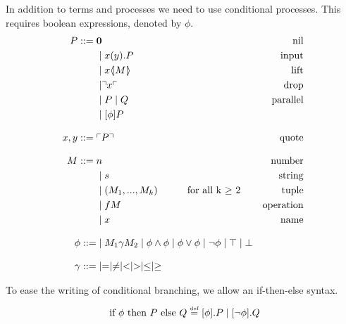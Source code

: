 In addition to terms and processes we need to use conditional processes. This requires boolean expressions, denoted by \ensuremath{\phi}.
\begin{align*}
P  ::= \; &  \mathbf{0} & \text{nil} \\
      & \mid x(y).P & \text{input} \\
	  & \mid x \langle \! | M | \! \rangle&\text{lift}\\
      & \mid \urcorner x \ulcorner & \text{drop} \\
      & \mid P \mid Q & \text{parallel} \\
      & \mid [\phi] P\\[3mm]
    x,y ::= \; & \ulcorner P \urcorner & \text{quote}\\[3mm]
M::=\; & n &\text{number}\\
 	  &\mid s &\text{string}\\
 	  &\mid (M_1,...,M_k)\quad\quad\quad \text{for all k $\geq$ 2} &\text{tuple}\\
 	  &\mid fM &\text{operation}\\
 	  &\mid x &\text{name}\\[3mm]
\phi ::=& \mid M_1\gamma M_2 \mid \phi\land\phi \mid \phi\lor\phi \mid \neg\phi \mid \top \mid \bot\\[3mm]
\gamma ::=& \mid = \mid \neq \mid < \mid > \mid \leq \mid \geq
\end{align*}

To ease the writing of conditional branching, we allow an if-then-else syntax.
\begin{align*}
	\text{ if }\phi\text{ then }P\text{ else }Q \overset{\underset{\mathrm{def}}{}}{=} [\phi].P \mid [\neg \phi].Q
\end{align*}


